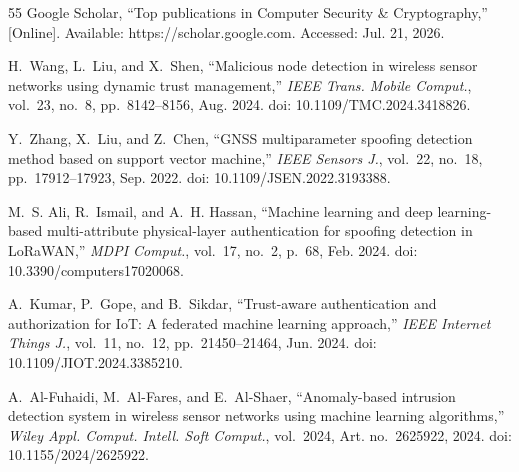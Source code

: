 \documentclass[journal]{IEEEtran}
\begin{document}
\begin{thebibliography}{55}
Google Scholar, ``Top publications in Computer Security \& Cryptography,'' [Online]. Available: https://scholar.google.com. Accessed: Jul. 21, 2026.

H.~Wang, L.~Liu, and X.~Shen, ``Malicious node detection in wireless sensor networks using dynamic trust management,'' \textit{IEEE Trans. Mobile Comput.}, vol.~23, no.~8, pp.~8142--8156, Aug. 2024. doi: 10.1109/TMC.2024.3418826.

Y.~Zhang, X.~Liu, and Z.~Chen, ``GNSS multiparameter spoofing detection method based on support vector machine,'' \textit{IEEE Sensors J.}, vol.~22, no.~18, pp.~17912--17923, Sep. 2022. doi: 10.1109/JSEN.2022.3193388.

M.~S. Ali, R.~Ismail, and A.~H. Hassan, ``Machine learning and deep learning-based multi-attribute physical-layer authentication for spoofing detection in LoRaWAN,'' \textit{MDPI Comput.}, vol.~17, no.~2, p.~68, Feb. 2024. doi: 10.3390/computers17020068.

A.~Kumar, P.~Gope, and B.~Sikdar, ``Trust-aware authentication and authorization for IoT: A federated machine learning approach,'' \textit{IEEE Internet Things J.}, vol.~11, no.~12, pp.~21450--21464, Jun. 2024. doi: 10.1109/JIOT.2024.3385210.

A.~Al-Fuhaidi, M.~Al-Fares, and E.~Al-Shaer, ``Anomaly-based intrusion detection system in wireless sensor networks using machine learning algorithms,'' \textit{Wiley Appl. Comput. Intell. Soft Comput.}, vol.~2024, Art. no.~2625922, 2024. doi: 10.1155/2024/2625922.

\end{thebibliography}
\end{document}
